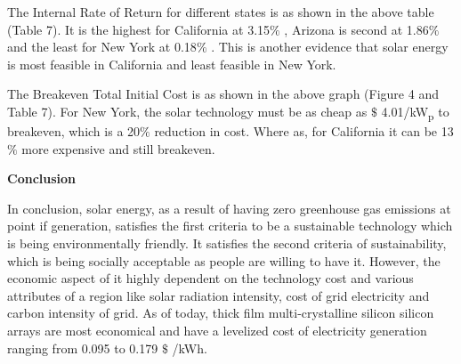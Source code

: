 \documentclass[12pt]{article}
\begin{document}
\vspace{\baselineskip}
\begin{justify}
The Internal Rate of Return for different states is as shown in the above table (Table 7). It is the highest for California at 3.15$\%$ , Arizona is second at 1.86$\%$  and the least for New York at 0.18$\%$ . This is another evidence that solar energy is most feasible in California and least feasible in New York.
\end{justify}\par

\par 

\vspace{\baselineskip}
\begin{justify}
The Breakeven Total Initial Cost is as shown in the above graph (Figure 4 and Table 7). For New York, the solar technology must be as cheap as $\$$ 4.01/kW\textsubscript{p }to breakeven, which is a 20$\%$  reduction in cost. Where as, for California it can be 13$\%$  more expensive and still breakeven.
\end{justify}\par


\vspace{\baselineskip}



\newpage

\vspace{\baselineskip}\begin{justify}
\textbf{Conclusion}
\end{justify}\par


\vspace{\baselineskip}
\begin{justify}
In conclusion, solar energy, as a result of having zero greenhouse gas emissions at point if generation, satisfies the first criteria to be a sustainable technology which is being environmentally friendly. It satisfies the second criteria of sustainability, which is being socially acceptable as people are willing to have it. However, the economic aspect of it highly dependent on the technology cost and various attributes of a region like solar radiation intensity, cost of grid electricity and carbon intensity of grid. As of today, thick film multi-crystalline silicon silicon arrays are most economical and have a levelized cost of electricity generation ranging from 0.095 to 0.179 $\$$ /kWh. 
\end{justify}\par
\end{document}
